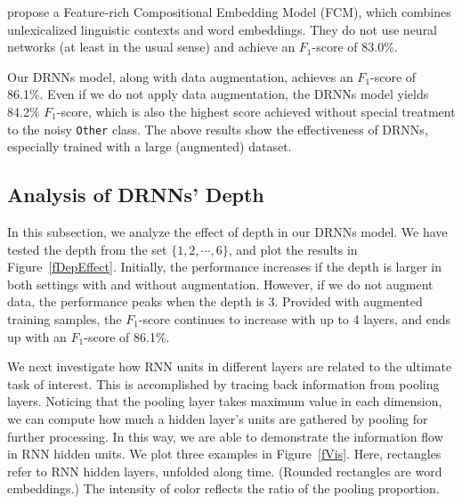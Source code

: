 \documentclass[11pt]{article}
\begin{document}
 propose a Feature-rich Compositional Embedding Model (FCM), which combines unlexicalized linguistic contexts and word embeddings.
They do not use neural networks (at least in the usual sense) and achieve an $F_1$-score of 83.0\%.

Our DRNNs model, along with data augmentation, achieves an $F_1$-score of 86.1\%. Even if we do not apply data augmentation, the DRNNs model yields 84.2\% $F_1$-score, which is also the highest score achieved without special treatment to the noisy \texttt{Other} class. The above results show the effectiveness of DRNNs, especially trained with a large (augmented) dataset.




\subsection{Analysis of DRNNs' Depth}\label{ssDRNNsDepth}


\begin{figwindow}
In this subsection, we analyze the effect of depth in our DRNNs model.
We have tested the depth from the set $\{1, 2, \cdots, 6\}$, and plot the results in Figure~\ref{fDepEffect}. Initially, the performance increases if the depth is larger in both settings with and without augmentation. However, if we do not augment data, the performance peaks when the depth is 3. Provided with augmented training samples, the $F_1$-score continues to increase with up to 4 layers, and ends up with an $F_1$-score of 86.1\%.

\indent We next investigate how RNN units in different layers are related to the ultimate task of interest. This is accomplished by tracing back information from pooling layers. Noticing that the pooling layer takes maximum value in each dimension, we can compute how much a hidden layer's units are gathered by pooling for further processing. In this way, we are able to demonstrate the information flow in RNN hidden units. We plot three examples in Figure~\ref{fVis}. Here, rectangles refer to RNN hidden layers, unfolded along time. (Rounded rectangles are word embeddings.) The intensity of color reflects the ratio of the pooling proportion.
\end{figwindow}
\end{document}
